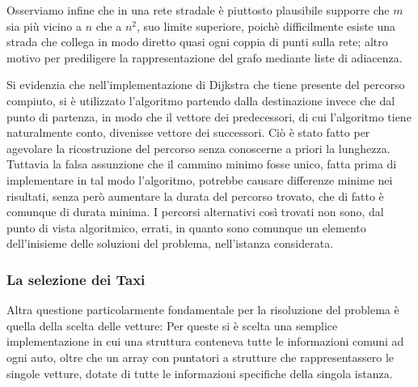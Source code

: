 \documentclass[a4paper,11pt]{Article}
\begin{document}
Osserviamo infine che in una rete stradale è piuttosto plausibile supporre che $m$ sia più vicino a $n$ che a $n^2$, suo limite superiore, poichè difficilmente esiste una strada che collega in modo diretto quasi ogni coppia di punti sulla rete; altro motivo per prediligere la rappresentazione del grafo mediante liste di adiacenza.

Si evidenzia che nell'implementazione di Dijkstra che tiene presente del percorso compiuto, si è utilizzato l'algoritmo partendo dalla destinazione invece che dal punto di partenza, in modo che il vettore dei predecessori, di cui l'algoritmo tiene naturalmente conto, divenisse vettore dei successori. Ciò è stato fatto per agevolare la ricostruzione del percorso senza conoscerne a priori la lunghezza.
Tuttavia la falsa assunzione che il cammino minimo fosse unico, fatta prima di implementare in tal modo l'algoritmo, potrebbe causare differenze minime nei risultati, senza però aumentare la durata del percorso trovato, che di fatto è comunque di durata minima. I percorsi alternativi così trovati non sono, dal punto di vista algoritmico, errati, in quanto sono comunque un elemento dell'inisieme delle soluzioni del problema, nell'istanza considerata.

\subsubsection{La selezione dei Taxi}

Altra questione particolarmente fondamentale per la risoluzione del problema è quella della scelta delle vetture: Per queste si è scelta una semplice implementazione in cui una struttura conteneva tutte le informazioni comuni ad ogni auto, oltre che un array con puntatori a strutture che rappresentassero le singole vetture, dotate di tutte le informazioni specifiche della singola istanza.
\end{document}
